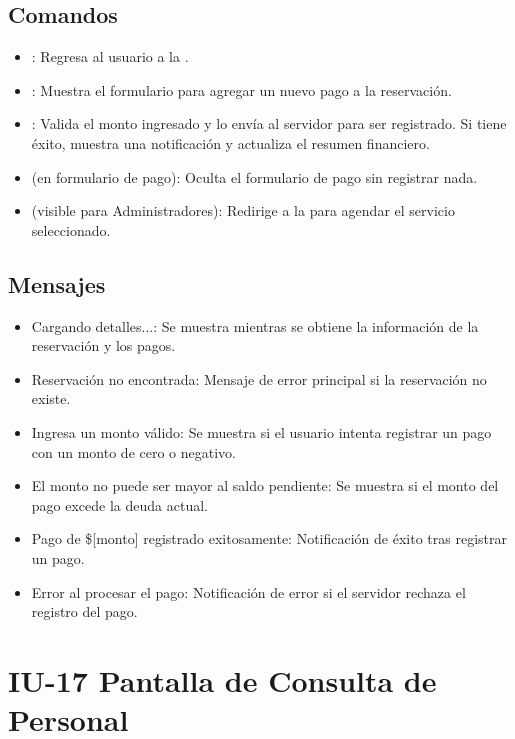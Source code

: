 \subsection{Comandos}
\begin{itemize}
    \item {}: Regresa al usuario a la .
    \item {}: Muestra el formulario para agregar un nuevo pago a la reservación.
    \item {}: Valida el monto ingresado y lo envía al servidor para ser registrado. Si tiene éxito, muestra una notificación y actualiza el resumen financiero.
    \item {} (en formulario de pago): Oculta el formulario de pago sin registrar nada.
    \item {} (visible para Administradores): Redirige a la  para agendar el servicio seleccionado.
\end{itemize}

\subsection{Mensajes}
\begin{itemize}
    \item Cargando detalles...: Se muestra mientras se obtiene la información de la reservación y los pagos.
    \item Reservación no encontrada: Mensaje de error principal si la reservación no existe.
    \item Ingresa un monto válido: Se muestra si el usuario intenta registrar un pago con un monto de cero o negativo.
    \item El monto no puede ser mayor al saldo pendiente: Se muestra si el monto del pago excede la deuda actual.
    \item Pago de \$[monto] registrado exitosamente: Notificación de éxito tras registrar un pago.
    \item Error al procesar el pago: Notificación de error si el servidor rechaza el registro del pago.
\end{itemize}

\section{IU-17 Pantalla de Consulta de Personal}

